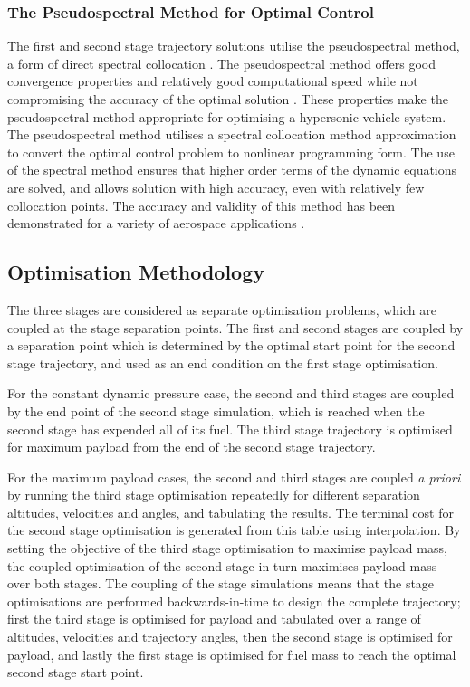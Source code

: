 \documentclass[]{aiaa-tc}
\begin{document}
\subsubsection{The Pseudospectral Method for Optimal Control}
The first and second stage trajectory solutions utilise the pseudospectral method, a form of direct spectral collocation \cite{Fahroo2000}. The pseudospectral method offers good convergence properties and relatively good computational speed while not compromising the accuracy of the optimal solution \cite{Fasano2013}. These properties make the pseudospectral method appropriate for optimising a hypersonic vehicle system. 
The pseudospectral method utilises a spectral collocation method approximation to convert the optimal control problem to nonlinear programming form. The use of the spectral method ensures that higher order terms of the dynamic equations are solved, and allows solution with high accuracy, even with relatively few collocation points\cite{Fahroo1999}. The accuracy and validity of this method has been demonstrated for a variety of aerospace applications \cite{Bedrossian,Huntington2008,Josselyn2002,Yan2007}. 

\subsection{Optimisation Methodology}
	 The three stages are considered as separate optimisation problems, which are coupled at the stage separation points.  
	 The first and second stages are coupled by a separation point which is determined by the optimal start point for the second stage trajectory, and used as an end condition on the first stage optimisation.
	 
	 For the constant dynamic pressure case, the second and third stages are coupled by the end point of the second stage simulation, which is reached when the second stage has expended all of its fuel. The third stage trajectory is optimised for maximum payload from the end of the second stage trajectory.
	 
	 For the maximum payload cases, the second and third stages are coupled \textit{a priori} by running the third stage optimisation repeatedly for different separation altitudes, velocities and angles, and tabulating the results. The terminal cost for the second stage optimisation is generated from this table using interpolation. By setting the objective of the third stage optimisation to maximise payload mass, the coupled optimisation of the second stage in turn maximises payload mass over both stages. 
	 The coupling of the stage simulations means that the stage optimisations are performed backwards-in-time to design the complete trajectory; first the third stage is optimised for payload and tabulated over a range of altitudes, velocities and trajectory angles, then the second stage is optimised for payload, and lastly the first stage is optimised for fuel mass to reach the optimal second stage start point. 
	 
\end{document}
